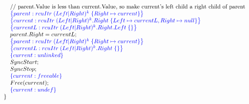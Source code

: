 \[\begin{array}{@{}l@{}}
                \;\;\;\;\;\;\text{// parent.Value is less than current.Value, so make current's left child a right child of parent}\\
                \;\;\;\;\;\;\specline{parent:rcuItr\; (Left|Right)^{k} \; \{ Right \mapsto current\} }\\
                \;\;\;\;\;\;\specline{current:rcuItr\; (Left|Right)^{k}.Right \; \{Left\mapsto currentL, Right \mapsto null\} }\\
                \;\;\;\;\;\;\specline{currentL:rcuItr\; (Left|Right)^{k}.Right.Left \; \{\} }\\
                \;\;\;\;\;\;parent.Right = currentL;\\
                \;\;\;\;\;\;\specline{parent:rcuItr\; (Left|Right)^{k} \; \{ Right \mapsto current\} }\\
                \;\;\;\;\;\;\specline{currentL:rcuItr\; (Left|Right)^{k}.Right \; \{\} }\\
                \;\;\;\;\;\;\specline{current:unlinked }\\
                \;\;\;\;\;\;SyncStart;\\
                \;\;\;\;\;\;SyncStop;\\
                \;\;\;\;\;\;\specline{current:freeable}\\
                \;\;\;\;\;\;Free(current);\\
                \;\;\;\;\;\;\specline{current:undef}\\
    \;\;\}\\
\end{array}
\]

